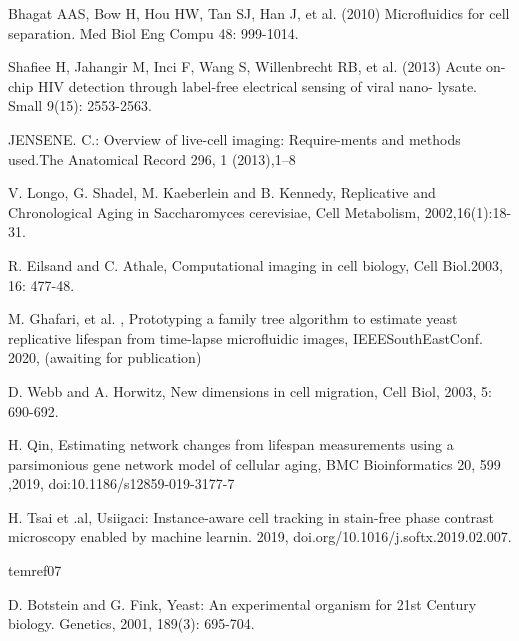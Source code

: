 \documentclass[conference]{IEEEtran}
\begin{document}
\begin{thebibliography}{00}
 Bhagat AAS, Bow H, Hou HW, Tan SJ, Han J, et al. (2010) Microfluidics for cell separation. Med Biol Eng Compu 48: 999-1014.

Shafiee H, Jahangir M, Inci F, Wang S, Willenbrecht RB, et al. (2013) Acute on-chip HIV detection through label-free electrical sensing of viral nano- lysate. Small 9(15): 2553-2563.




JENSENE. C.: Overview of live-cell imaging: Require-ments and methods used.The Anatomical Record 296, 1 (2013),1–8


V. Longo, G. Shadel, M. Kaeberlein and B.  Kennedy, Replicative and Chronological Aging in Saccharomyces cerevisiae, Cell Metabolism, 2002,16(1):18-31.




R. Eilsand and C. Athale, Computational imaging in cell biology, Cell Biol.2003, 16: 477-48.

M. Ghafari,  et al. , Prototyping a family tree algorithm to estimate yeast replicative lifespan from time-lapse microfluidic images, IEEESouthEastConf. 2020, (awaiting for publication)



D. Webb and A. Horwitz, New dimensions in cell migration, Cell Biol, 2003,  5: 690-692.


H. Qin, Estimating network changes from lifespan measurements using a parsimonious gene network model of cellular aging, BMC Bioinformatics 20, 599 ,2019, doi:10.1186/s12859-019-3177-7









H. Tsai et .al, Usiigaci: Instance-aware cell tracking in stain-free phase contrast microscopy enabled by machine learnin. 2019, doi.org/10.1016/j.softx.2019.02.007.

\bibi



tem{ref07}

D. Botstein and G. Fink, Yeast: An experimental organism for 21st Century biology. Genetics, 2001, 189(3): 695-704.



\end{thebibliography}
\end{document}
